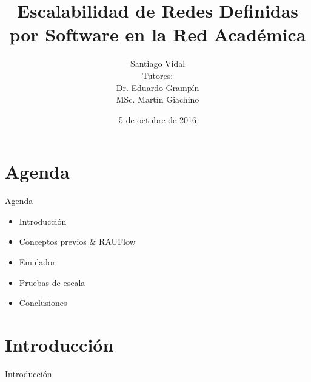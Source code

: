 \documentclass[xcolor=svgnames,handout]{beamer}
\title
  {Escalabilidad de Redes Definidas por Software en la Red Académica}
\author
  {Santiago Vidal \\
  	{\normalfont Tutores: \\
  	Dr. Eduardo Grampín \\
  	MSc. Martín Giachino}}
\date
  {5 de octubre de 2016}
\institute
  {Instituto de Computación \\
  	Facultad de Ingeniería \\
  	Universidad de la República}
\begin{document}
\maketitle

\section{Agenda}

\begin{frame}{Agenda}

  \begin{itemize}
	  \item Introducción
	  \item Conceptos previos \& RAUFlow
	  \item Emulador
	  \item Pruebas de escala
	  \item Conclusiones
  \end{itemize}
\end{frame}

\section
  {Introducción}

\begin{frame}{Introducción}
	
\end{frame}

%


%
%
%
\end{document}
